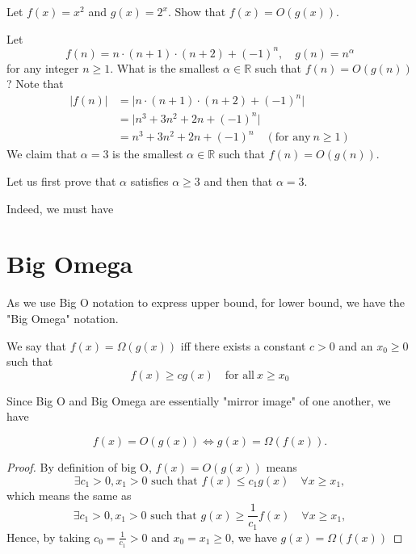 \begin{exercise}
    Let \(f(x) = x^2\) and \(g(x) = 2^x\). Show that \(f(x) = O(g(x))\).
\end{exercise}

\begin{eg}
    Let
    \[
        f(n) = n \cdot (n + 1) \cdot (n + 2) + (-1)^n, \quad g(n) = n^\alpha 
    \]
    for any integer \(n \geq 1\). What is the smallest \(\alpha \in \mathbb{R}\) such that \(f(n) = O(g(n))\)?
    Note that
    \[
        \begin{aligned}
            \vert f(n) \vert &= \vert n \cdot (n + 1) \cdot (n + 2) + (-1)^n \vert \\
            &= \vert n^3 + 3n^2 + 2n + (-1)^n \vert \\
            &= n^3 + 3n^2 + 2n + (-1)^n\quad (\text{for any}\ n \geq 1)
        \end{aligned}
    \] 
    We claim that \(\alpha = 3\) is the smallest \(\alpha \in \mathbb{R}\) such that \(f(n) = O(g(n))\).

    Let us first prove that \(\alpha\) satisfies \(\alpha \geq 3\) and then that \(\alpha = 3\). 

    Indeed, we must have 
\end{eg}


\section{Big Omega}
As we use Big O notation to express upper bound, for lower bound, we have the "Big Omega" notation.
\begin{definition}
    We say that \(f(x) = \Omega(g(x))\) iff there exists a constant \(c > 0\) and an \(x_0 \geq 0\) such that
    \[
    f(x) \geq cg(x)\quad\text{for all}\ x \geq x_0
    \]
\end{definition}

Since Big O and Big Omega are essentially "mirror image" of one another, we have

\begin{theorem}
   \[
    f(x) = O(g(x)) \Longleftrightarrow g(x) = \Omega (f(x)).
   \] 
\end{theorem}

\begin{proof}
    By definition of big O, \(f(x) = O(g(x))\) means
    \[
        \exists c_1 > 0, x_1 > 0 \text{ such that } f(x) \leq c_1 g(x) \quad \forall x \geq x_1,
    \] 
    which means the same as
    \[
        \exists c_1 > 0, x_1 > 0 \text{ such that } g(x) \geq \dfrac{1}{c_1}f(x) \quad \forall x \geq x_1,
    \]
    Hence, by taking \(c_0 = \frac{1}{c_1} > 0\) and \(x_0 = x_1 \geq 0\), we have \(g(x) = \Omega(f(x))\) 
\end{proof}

